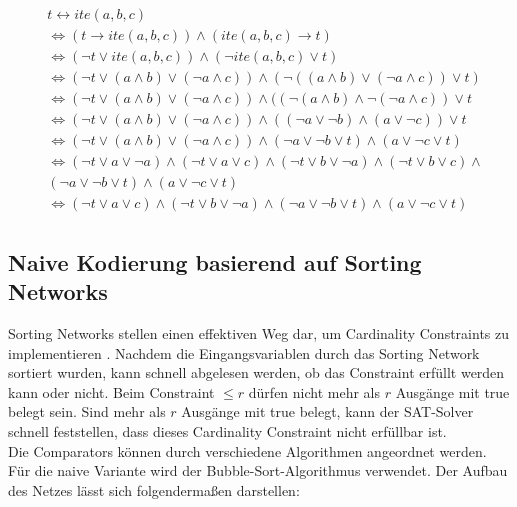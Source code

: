 \documentclass[a4,abstract=on]{scrartcl}
\begin{document}
\begin{align*}
\begin{aligned}
&t \leftrightarrow ite(a,b,c)\\
&\Leftrightarrow (t \rightarrow ite (a,b,c)) \wedge (ite (a,b,c) \rightarrow t)\\
&\Leftrightarrow (\neg t \vee ite(a,b,c)) \wedge (\neg ite(a,b,c) \vee t)\\
&\Leftrightarrow (\neg t \vee (a \wedge b) \vee (\neg a \wedge c)) \wedge (\neg((a \wedge b) \vee (\neg a \wedge c)) \vee t)\\
&\Leftrightarrow (\neg t \vee (a \wedge b) \vee (\neg a \wedge c)) \wedge ((\neg(a \wedge b) \wedge \neg (\neg a \wedge c)) \vee t\\
&\Leftrightarrow (\neg t \vee (a \wedge b) \vee (\neg a \wedge c)) \wedge ((\neg a \vee \neg b) \wedge (a \vee \neg c)) \vee t\\
&\Leftrightarrow (\neg t \vee (a \wedge b) \vee (\neg a \wedge c)) \wedge (\neg a \vee \neg b \vee t) \wedge (a \vee \neg c \vee t)\\
&\Leftrightarrow (\neg t \vee a \vee \neg a) \wedge (\neg t \vee a\vee c) \wedge (\neg t \vee b \vee \neg a) \wedge (\neg t \vee b \vee c) \wedge \\
& (\neg a \vee \neg b \vee t) \wedge (a \vee \neg c \vee t)\\
&\Leftrightarrow (\neg t \vee a\vee c) \wedge (\neg t \vee b \vee \neg a) \wedge (\neg a \vee \neg b \vee t) \wedge (a \vee \neg c \vee t)
\end{aligned}
\end{align*}


	\subsection{Naive Kodierung basierend auf Sorting Networks}
Sorting Networks stellen einen effektiven Weg dar, um Cardinality Constraints zu implementieren \cite[vgl.][]{niklasse}. Nachdem die Eingangsvariablen durch das Sorting Network sortiert wurden, kann schnell abgelesen werden, ob das Constraint erfüllt werden kann oder nicht.
Beim Constraint $\leq r$ dürfen nicht mehr als $r$ Ausgänge mit true belegt sein. Sind mehr als $r$ Ausgänge mit true belegt, kann der SAT-Solver schnell feststellen, dass dieses Cardinality Constraint nicht erfüllbar ist.\\
Die Comparators können durch verschiedene Algorithmen angeordnet werden. Für die naive Variante wird der Bubble-Sort-Algorithmus \cite[][]{bubble} verwendet. Der Aufbau des Netzes lässt sich folgendermaßen darstellen:\\
\end{document}
